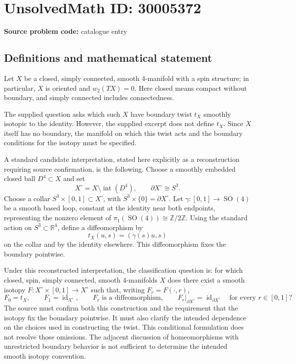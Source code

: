 \documentclass[11pt]{article}
\newcommand{\Z}{\mathbb{Z}}
\newcommand{\R}{\mathbb{R}}
\begin{document}
\section*{UnsolvedMath ID: 30005372}
\textbf{Source problem code:} catalogue entry
\subsection{Definitions and mathematical statement}
Let \(X\) be a closed, simply connected, smooth \(4\)-manifold with a spin structure; in particular, \(X\) is oriented and \(w_2(TX)=0\). Here closed means compact without boundary, and simply connected includes connectedness.

The supplied question asks which such \(X\) have boundary twist \(t_X\) smoothly isotopic to the identity. However, the supplied excerpt does not define \(t_X\). Since \(X\) itself has no boundary, the manifold on which this twist acts and the boundary conditions for the isotopy must be specified.

A standard candidate interpretation, stated here explicitly as a reconstruction requiring source confirmation, is the following. Choose a smoothly embedded closed ball \(D^4\subset X\) and set
\[
X^{\circ}=X\setminus\operatorname{int}(D^4),\qquad \partial X^{\circ}\cong S^3.
\]
Choose a collar \(S^3\times[0,1]\subset X^{\circ}\), with \(S^3\times\{0\}=\partial X^{\circ}\). Let \(\gamma:[0,1]\to\operatorname{SO}(4)\) be a smooth based loop, constant at the identity near both endpoints, representing the nonzero element of \(\pi_1(\operatorname{SO}(4))\cong\Z/2\Z\). Using the standard action on \(S^3\subset\R^4\), define a diffeomorphism by
\[
t_X(u,s)=(\gamma(s)u,s)
\]
on the collar and by the identity elsewhere. This diffeomorphism fixes the boundary pointwise.

Under this reconstructed interpretation, the classification question is: for which closed, spin, simply connected, smooth \(4\)-manifolds \(X\) does there exist a smooth isotopy \(F:X^{\circ}\times[0,1]\to X^{\circ}\) such that, writing \(F_r=F(\cdot,r)\),
\[
F_0=t_X,\qquad F_1=\operatorname{id}_{X^{\circ}},\qquad
F_r\text{ is a diffeomorphism},\qquad
F_r|_{\partial X^{\circ}}=\operatorname{id}_{\partial X^{\circ}}
\quad\text{for every }r\in[0,1]?
\]
The source must confirm both this construction and the requirement that the isotopy fix the boundary pointwise. It must also clarify the intended dependence on the choices used in constructing the twist. This conditional formulation does not resolve those omissions. The adjacent discussion of homeomorphisms with unrestricted boundary behavior is not sufficient to determine the intended smooth isotopy convention.
\end{document}
